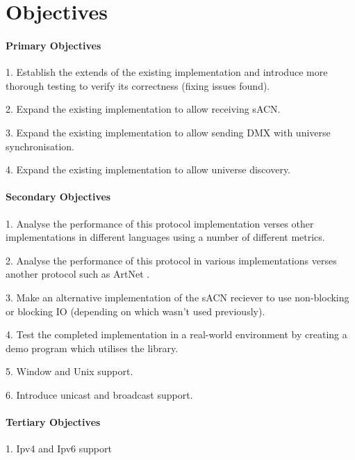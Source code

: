 \documentclass[12pt,a4paper,notitlepage]{report}
\begin{document}
\section*{Objectives}
\paragraph*{Primary Objectives}
\begin{list}{}{}
	\item 1. Establish the extends of the existing implementation and introduce more thorough testing to verify its correctness (fixing issues found).
	\item 2. Expand the existing implementation to allow receiving sACN.
	\item 3. Expand the existing implementation to allow sending DMX with universe synchronisation.
	\item 4. Expand the existing implementation to allow universe discovery.
\end{list}

\paragraph*{Secondary Objectives}
\begin{list}{}{}
	\item 1. Analyse the performance of this protocol implementation verses other implementations in different languages using a number of different metrics.
	\item 2. Analyse the performance of this protocol in various implementations verses another protocol such as ArtNet \cite{ArtNet}.
	\item 3. Make an alternative implementation of the sACN reciever to use non-blocking or blocking IO (depending on which wasn't used previously).
	\item 4. Test the completed implementation in a real-world environment by creating a demo program which utilises the library. 
	\item 5. Window and Unix support.
	\item 6. Introduce unicast and broadcast support.
\end{list}

\paragraph*{Tertiary Objectives}
\begin{list}{}{}
	\item 1. Ipv4 and Ipv6 support
\end{list}
\end{document}
